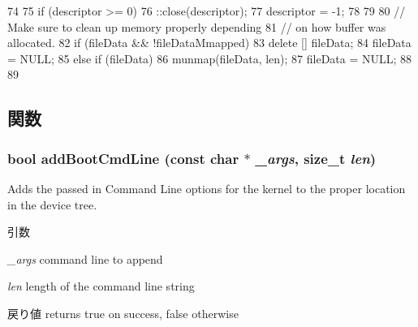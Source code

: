 \begin{DoxyCode}
74 {
75     if (descriptor >= 0) {
76         ::close(descriptor);
77         descriptor = -1;
78     }
79 
80     // Make sure to clean up memory properly depending
81     // on how buffer was allocated.
82     if (fileData && !fileDataMmapped) {
83         delete [] fileData;
84         fileData = NULL;
85     } else if (fileData) {
86         munmap(fileData, len);
87         fileData = NULL;
88     }
89 }
\end{DoxyCode}


\subsection{関数}
\hypertarget{classDtbObject_a3d1578c362819bbd3af37cbbfeb6732e}{
\subsubsection[{addBootCmdLine}]{\setlength{\rightskip}{0pt plus 5cm}bool addBootCmdLine (const char $\ast$ {\em \_\-args}, \/  size\_\-t {\em len})}}
\label{classDtbObject_a3d1578c362819bbd3af37cbbfeb6732e}
Adds the passed in Command Line options for the kernel to the proper location in the device tree. 
\begin{DoxyParams}{引数}
\item[{\em \_\-args}]command line to append \item[{\em len}]length of the command line string \end{DoxyParams}
\begin{DoxyReturn}{戻り値}
returns true on success, false otherwise 
\end{DoxyReturn}




